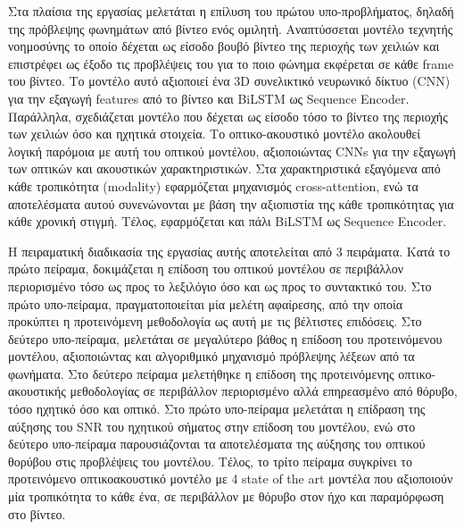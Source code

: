 Στα πλαίσια της εργασίας μελετάται η επίλυση του πρώτου υπο-προβλήματος, δηλαδή της πρόβλεψης φωνημάτων από βίντεο ενός ομιλητή. Αναπτύσσεται μοντέλο τεχνητής νοημοσύνης το οποίο δέχεται ως είσοδο βουβό βίντεο της περιοχής των χειλιών και επιστρέφει ως έξοδο τις προβλέψεις του για το ποιο φώνημα εκφέρεται σε κάθε frame του βίντεο. Το μοντέλο αυτό αξιοποιεί ένα 3D συνελικτικό νευρωνικό δίκτυο (CNN) για την εξαγωγή features από το βίντεο και BiLSTM ως Sequence Encoder. Παράλληλα, σχεδιάζεται μοντέλο που δέχεται ως είσοδο τόσο το βίντεο της περιοχής των χειλιών όσο και ηχητικά στοιχεία. Το οπτικο-ακουστικό μοντέλο ακολουθεί λογική παρόμοια με αυτή του οπτικού μοντέλου, αξιοποιώντας CNNs για την εξαγωγή των οπτικών και ακουστικών χαρακτηριστικών. Στα χαρακτηριστικά εξαγόμενα από κάθε τροπικότητα (modality) εφαρμόζεται μηχανισμός cross-attention, ενώ τα αποτελέσματα αυτού συνενώνονται με βάση την αξιοπιστία της κάθε τροπικότητας για κάθε χρονική στιγμή. Τέλος, εφαρμόζεται και πάλι BiLSTM ως Sequence Encoder.

Η πειραματική διαδικασία της εργασίας αυτής αποτελείται από 3 πειράματα. Κατά το πρώτο πείραμα, δοκιμάζεται η επίδοση του οπτικού μοντέλου σε περιβάλλον περιορισμένο τόσο ως προς το λεξιλόγιο όσο και ως προς το συντακτικό του. Στο πρώτο υπο-πείραμα, πραγματοποιείται μία μελέτη αφαίρεσης, από την οποία προκύπτει η προτεινόμενη μεθοδολογία ως αυτή με τις βέλτιστες επιδόσεις. Στο δεύτερο υπο-πείραμα, μελετάται σε μεγαλύτερο βάθος η επίδοση του προτεινόμενου μοντέλου, αξιοποιώντας και αλγοριθμικό μηχανισμό πρόβλεψης λέξεων από τα φωνήματα. Στο δεύτερο πείραμα μελετήθηκε η επίδοση της προτεινόμενης οπτικο-ακουστικής μεθοδολογίας σε περιβάλλον περιορισμένο αλλά επηρεασμένο από θόρυβο, τόσο ηχητικό όσο και οπτικό. Στο πρώτο υπο-πείραμα μελετάται η επίδραση της αύξησης του SNR του ηχητικού σήματος στην επίδοση του μοντέλου, ενώ στο δεύτερο υπο-πείραμα παρουσιάζονται τα αποτελέσματα της αύξησης του οπτικού θορύβου στις προβλέψεις του μοντέλου. Τέλος, το τρίτο πείραμα συγκρίνει το προτεινόμενο οπτικοακουστικό μοντέλο με 4 state of the art μοντέλα που αξιοποιούν μία τροπικότητα το κάθε ένα, σε περιβάλλον με θόρυβο στον ήχο και παραμόρφωση στο βίντεο.